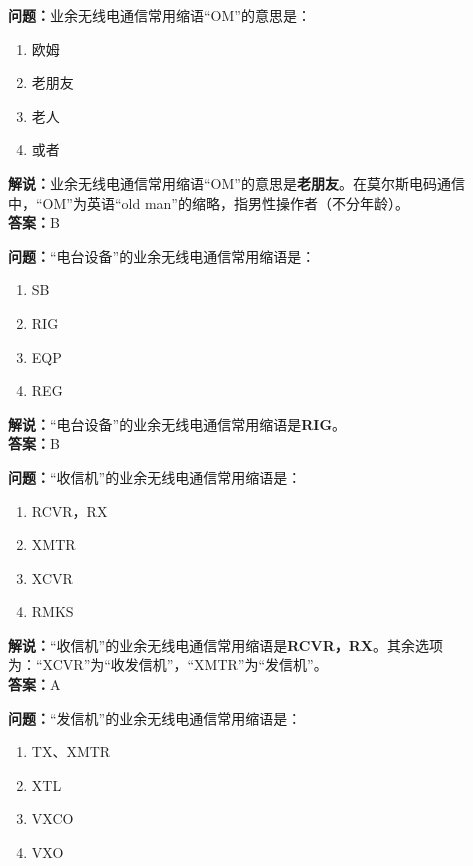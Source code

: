 \textbf{问题：}业余无线电通信常用缩语“OM”的意思是：

\begin{enumerate}[label=\Alph*), leftmargin=1.5cm]
	\item 欧姆
	\item 老朋友
	\item 老人
	\item 或者
\end{enumerate}

\textbf{解说：}业余无线电通信常用缩语“OM”的意思是\textbf{老朋友}。在莫尔斯电码通信中，“OM”为英语“old man”的缩略，指男性操作者（不分年龄）。\\\textbf{答案：}B



\textbf{问题：}“电台设备”的业余无线电通信常用缩语是：

\begin{enumerate}[label=\Alph*), leftmargin=1.5cm]
	\item SB
	\item RIG
	\item EQP
	\item REG
\end{enumerate}

\textbf{解说：}“电台设备”的业余无线电通信常用缩语是\textbf{RIG}。\\\textbf{答案：}B



\textbf{问题：}“收信机”的业余无线电通信常用缩语是：

\begin{enumerate}[label=\Alph*), leftmargin=1.5cm]
	\item RCVR，RX
	\item XMTR
	\item XCVR
	\item RMKS
\end{enumerate}

\textbf{解说：}“收信机”的业余无线电通信常用缩语是\textbf{RCVR，RX}。其余选项为：“XCVR”为“收发信机”，“XMTR”为“发信机”。\\\textbf{答案：}A



\textbf{问题：}“发信机”的业余无线电通信常用缩语是：

\begin{enumerate}[label=\Alph*), leftmargin=1.5cm]
	\item TX、XMTR
	\item XTL
	\item VXCO
	\item VXO
\end{enumerate}

